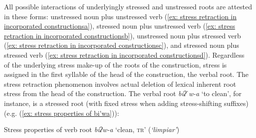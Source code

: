                                 \label{ex: stress retraction in incorporated constructionsg}
    \z
\z

All possible interactions of underlyingly stressed and unstressed roots are attested in these forms: unstressed noun plus unstressed verb (\ref{ex: stress retraction in incorporated constructionsa}), stressed noun plus unstressed verb (\ref{ex: stress retraction in incorporated constructionsb}), unstressed noun plus stressed verb (\ref{ex: stress retraction in incorporated constructionsc}), and stressed noun plus stressed verb (\ref{ex: stress retraction in incorporated constructionsd}). Regardless of the underlying stress make-up of the roots of the construction, stress is assigned in the first syllable of the head of the construction, the verbal root. The stress retraction phenomenon involves actual deletion of lexical inherent root stress from the head of the construction. The verbal root \textit{biʔˈw-a} ‘to clean’, for instance, is a stressed root (with fixed stress when adding stress-shifting suffixes) (e.g. (\ref{ex: stress properties of bi'wa})):

\ea\label{ex: stress properties of bi'wa}
{Stress properties of verb root \textit{biʔw-a} ‘clean, \textsc{tr}’ (\textit{‘limpiar’})}


